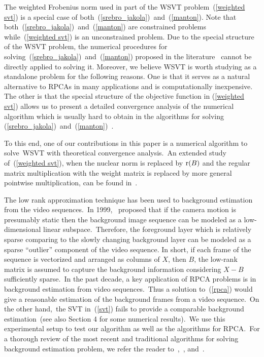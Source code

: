 \documentclass[twoside,11pt]{article}
\begin{document}
The weighted Frobenius norm used in part of the WSVT problem~(\ref{weighted svt}) is a special case of both~(\ref{srebro_jakola})~and~(\ref{manton}). Note that both~(\ref{srebro_jakola})~and~(\ref{manton}) are constrained problems while~(\ref{weighted svt}) is an unconstrained problem. Due to the special structure of the WSVT problem, the numerical procedures for solving~(\ref{srebro_jakola})~and~(\ref{manton}) proposed in the literature~\citep{srebro, wibergjapan, wiberg, srebromaxmatrix, Buchanan, erikssonhengel, markovosky,markovosky1,markovosky3,markovosky4} cannot be directly applied to solving it. Moreover, we believe WSVT is worth studying as a standalone problem for the following reasons. One is that it serves as a natural alternative to RPCAs in many applications and is computationally inexpensive. The other is that the special structure of the objective function in (\ref{weighted svt}) allows us to present a detailed convergence analysis of the numerical algorithm which is usually hard to obtain in the algorithms for solving (\ref{srebro_jakola})~and~(\ref{manton})~\citep{srebro,manton,markovosky,wiberg,wibergjapan}.

To this end, one of our contributions in this paper is a numerical algorithm to solve~WSVT with theoretical convergence analysis.~An extended study of~(\ref{weighted svt}), when the nuclear norm is replaced by ${\rm r}(B)$ and the regular matrix multiplication with the weight matrix is replaced by more general pointwise multiplication, can be found in~\citet{duttali}.


The low rank approximation technique has been used to background estimation from the video sequences.~In 1999,~\citet{oliver} proposed that if the camera motion is presumably static then the background image sequence can be modeled as a low-dimensional linear subspace.~Therefore, the foreground layer which is relatively sparse comparing to the slowly changing background layer can be modeled as a sparse ``outlier'' component of the video sequence. In short, if each frame of the sequence is vectorized and arranged as columns of $X$, then $B$, the low-rank matrix is assumed to capture the background information considering $X-B$ sufficiently sparse.~In the past decade, a key application of RPCA problems is in background estimation from video sequences.~Thus a solution to~(\ref{rpca}) would give a reasonable estimation of the background frames from a video sequence.~On the other hand,~the SVT in~(\ref{svt}) fails to provide a comparable background estimation~(see also Section 4 for some numerical results).~We use this experimental setup to test our algorithm as well as the algorithms for RPCA.~For a thorough review of the most recent and traditional algorithms for solving background estimation problem, we refer the reader to~\cite{Bouwmans201431},~\citet{Sobral20144}, and~\citet{Bouwmans2016}.
\end{document}
